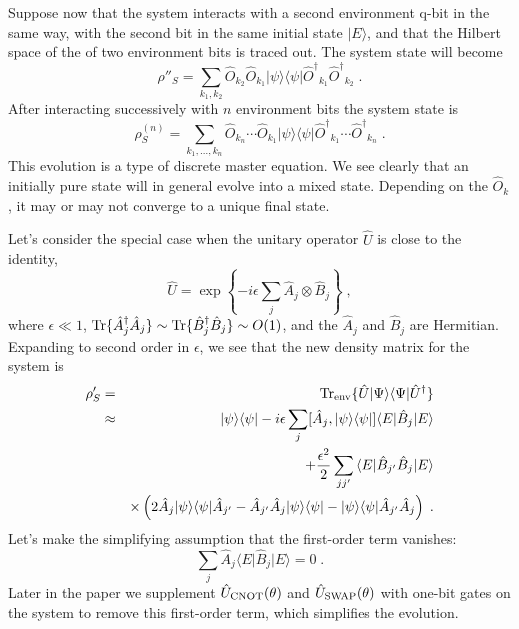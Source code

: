\documentclass[12pt]{article}
\def\bra#1{{\langle #1 |}}
\def\ket#1{{| #1 \rangle}}
\def\tr{{\rm Tr}}
\def\U{{\hat U}}
\def\Udag{{\hat U^\dagger}}
\def\O{{\hat O}}
\def\Odag{{\hat O^\dagger}}
\def\A{{\hat A}}
\def\Adag{{\hat A^\dagger}}
\def\B{{\hat B}}
\def\Bdag{{\hat B^\dagger}}
\begin{document}
Suppose now that the system interacts with a second environment q-bit in
the same way, with the second bit in the same initial state $\ket{E}$,
and that the Hilbert space of the of two environment bits is
traced out.  The system state will become
\begin{equation}
\rho''_S =
  \sum_{k_1,k_2} \O_{k_2} \O_{k_1} \ket\psi\bra\psi \Odag_{k_1} \Odag_{k_2} \;.
\end{equation}
After interacting successively with $n$ environment bits the system state is
\begin{equation}
\rho^{(n)}_S =
  \sum_{k_1,\ldots,k_n} \O_{k_n} \cdots \O_{k_1}
  \ket\psi\bra\psi \Odag_{k_1} \cdots \Odag_{k_n} \;.
\label{discrete_master}
\end{equation}
This evolution is a type of discrete master equation.  We see clearly that
an initially pure state will in general evolve into a mixed state.  Depending
on the $\O_k$, it may or may not converge to a unique final state.

Let's consider the special case when the unitary operator $\U$ is close
to the identity,
\begin{equation}
\U = \exp\left\{ - i \epsilon \sum_j \A_j\otimes\B_j \right\} \;,
\end{equation}
where $\epsilon\ll 1$, $\tr\{\Adag_j\A_j\} \sim \tr\{\Bdag_j\B_j\} \sim O(1)$,
and the $\A_j$ and $\B_j$ are Hermitian.  Expanding
to second order in $\epsilon$, we see that the new density matrix for the
system is
\begin{eqnarray}
\rho'_S &=& \tr_{\rm env} \{ \U \ket\Psi\bra\Psi \Udag \} \nonumber\\
&\approx& \ket\psi\bra\psi - 
  i \epsilon \sum_j [\A_j, \ket\psi\bra\psi] \bra{E}\B_j\ket{E} \nonumber\\
&& + {\epsilon^2\over2} \sum_{jj'} \bra{E}\B_{j'}\B_j\ket{E} \nonumber\\
&& \times
  \left( 2 \A_j \ket\psi\bra\psi \A_{j'} - \A_{j'}\A_j \ket\psi\bra\psi
  - \ket\psi\bra\psi \A_{j'}\A_j  \right) \;.
\label{infinitesimal_rho}
\end{eqnarray}
Let's make the simplifying assumption that the first-order term vanishes:
\begin{equation}
\sum_j \A_j \bra{E}\B_j\ket{E} = 0 \;.
\end{equation}
Later in the paper we supplement $\U_{\rm CNOT}(\theta)$ and
$\U_{\rm SWAP}(\theta)$ with one-bit gates on the system to remove this
first-order term, which simplifies the evolution.
\end{document}
